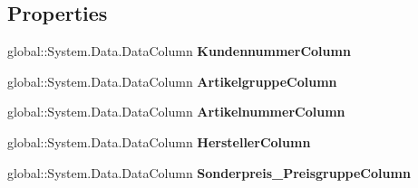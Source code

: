 \subsection*{Properties}
\begin{DoxyCompactItemize}
\item 
global\+::\+System.\+Data.\+Data\+Column {\bfseries Kundennummer\+Column}\hypertarget{class_products_1_1_data_1_1ds_sage_1_1_kunden_artikel_sonderpreise_data_table_ad82b6b97757a8350755103024fa3eae4}{}\label{class_products_1_1_data_1_1ds_sage_1_1_kunden_artikel_sonderpreise_data_table_ad82b6b97757a8350755103024fa3eae4}

\item 
global\+::\+System.\+Data.\+Data\+Column {\bfseries Artikelgruppe\+Column}\hypertarget{class_products_1_1_data_1_1ds_sage_1_1_kunden_artikel_sonderpreise_data_table_a8bea8e7b6f26d772e8f067ad9efd0c52}{}\label{class_products_1_1_data_1_1ds_sage_1_1_kunden_artikel_sonderpreise_data_table_a8bea8e7b6f26d772e8f067ad9efd0c52}

\item 
global\+::\+System.\+Data.\+Data\+Column {\bfseries Artikelnummer\+Column}\hypertarget{class_products_1_1_data_1_1ds_sage_1_1_kunden_artikel_sonderpreise_data_table_ae304ef3991299065476bb2effef86b93}{}\label{class_products_1_1_data_1_1ds_sage_1_1_kunden_artikel_sonderpreise_data_table_ae304ef3991299065476bb2effef86b93}

\item 
global\+::\+System.\+Data.\+Data\+Column {\bfseries Hersteller\+Column}\hypertarget{class_products_1_1_data_1_1ds_sage_1_1_kunden_artikel_sonderpreise_data_table_ab0512e05b3227f82fc4b4048f6904982}{}\label{class_products_1_1_data_1_1ds_sage_1_1_kunden_artikel_sonderpreise_data_table_ab0512e05b3227f82fc4b4048f6904982}

\item 
global\+::\+System.\+Data.\+Data\+Column {\bfseries Sonderpreis\+\_\+\+Preisgruppe\+Column}\hypertarget{class_products_1_1_data_1_1ds_sage_1_1_kunden_artikel_sonderpreise_data_table_aa03c0815d420e0cf803edaf32143b5e0}{}\label{class_products_1_1_data_1_1ds_sage_1_1_kunden_artikel_sonderpreise_data_table_aa03c0815d420e0cf803edaf32143b5e0}


\end{DoxyCompactItemize}
